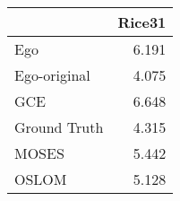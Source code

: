 \begin{tabular}{lr}
\toprule
{} & Rice31 \\
\midrule
Ego          &  6.191 \\
Ego-original &  4.075 \\
GCE          &  6.648 \\
Ground Truth &  4.315 \\
MOSES        &  5.442 \\
OSLOM        &  5.128 \\
\bottomrule
\end{tabular}
